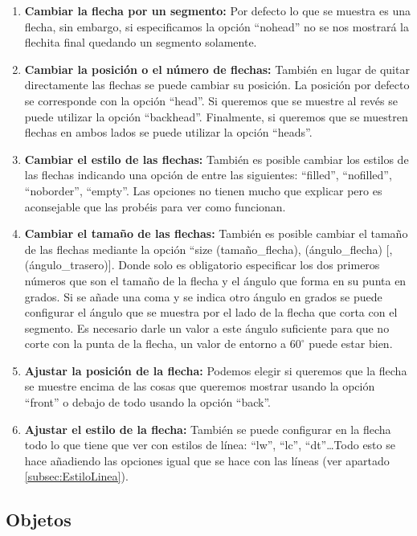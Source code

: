 \documentclass[11pt,a4paper,twoside,pdf]{article}
\numberwithin{equation}{section}
\begin{document}
\begin{enumerate}
	\item \textbf{Cambiar la flecha por un segmento:} Por defecto lo que se muestra es una flecha, sin embargo, si especificamos la opción ``nohead'' no se nos mostrará la flechita final quedando un segmento solamente.
	\item \textbf{Cambiar la posición o el número de flechas:} También en lugar de quitar directamente las flechas se puede cambiar su posición. La posición por defecto se corresponde con la opción ``head''. Si queremos que se muestre al revés se puede utilizar la opción ``backhead''. Finalmente, si queremos que se muestren flechas en ambos lados se puede utilizar la opción ``heads''.
	\item \textbf{Cambiar el estilo de las flechas:} También es posible cambiar los estilos de las flechas indicando una opción de entre las siguientes: ``filled'', ``nofilled'', ``noborder'', ``empty''. Las opciones no tienen mucho que explicar pero es aconsejable que las probéis para ver como funcionan.
	\item \textbf{Cambiar el tamaño de las flechas:} También es posible cambiar el tamaño de las flechas mediante la opción ``size (tamaño\_flecha), (ángulo\_flecha) [, (ángulo\_trasero)]. Donde solo es obligatorio especificar los dos primeros números que son el tamaño de la flecha y el ángulo que forma en su punta en grados. Si se añade una coma y se indica otro ángulo en grados se puede configurar el ángulo que se muestra por el lado de la flecha que corta con el segmento. Es necesario darle un valor a este ángulo suficiente para que no corte con la punta de la flecha, un valor de entorno a $60^{\circ}$ puede estar bien.
	\item \textbf{Ajustar la posición de la flecha:} Podemos elegir si queremos que la flecha se muestre encima de las cosas que queremos mostrar usando la opción ``front'' o debajo de todo usando la opción ``back''.
	\item \textbf{Ajustar el estilo de la flecha:} También se puede configurar en la flecha todo lo que tiene que ver con estilos de línea: ``lw'', ``lc'', ``dt''\ldots Todo esto se hace añadiendo las opciones igual que se hace con las líneas (ver apartado \ref{subsec:EstiloLinea}).
\end{enumerate}

\subsection{Objetos\label{subsec:Objetos}}
\end{document}
